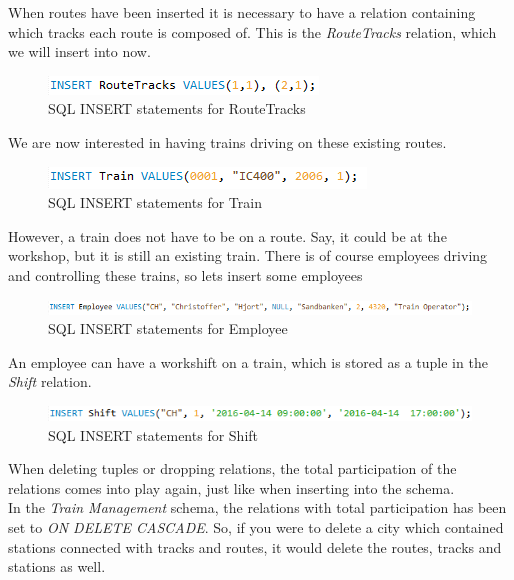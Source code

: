 When routes have been inserted it is necessary to have a relation containing which tracks each route is composed of. This is the \emph{RouteTracks} relation, which we will insert into now.

\begin{figure}[ht!]
    \centering
    \includegraphics[width=.5\textwidth]{img/INSERT_Statements_RouteTracks}
    \caption{SQL INSERT statements for RouteTracks}
\end{figure}

We are now interested in having trains driving on these existing routes.

\begin{figure}[ht!]
    \centering
    \includegraphics[width=.5\textwidth]{img/INSERT_Statements_Train}
    \caption{SQL INSERT statements for Train}
\end{figure}

However, a train does not have to be on a route. Say, it could be at the workshop, but it is still an existing train.
\newpage
There is of course employees driving and controlling these trains, so lets insert some employees

\begin{figure}[ht!]
    \centering
    \includegraphics[width=1\textwidth]{img/INSERT_Statements_Employee}
    \caption{SQL INSERT statements for Employee}
\end{figure}

An employee can have a workshift on a train, which is stored as a tuple in the \emph{Shift} relation.

\begin{figure}[ht!]
    \centering
    \includegraphics[width=.9\textwidth]{img/INSERT_Statements_Shift}
    \caption{SQL INSERT statements for Shift}
\end{figure}

When deleting tuples or dropping relations, the total participation of the relations comes into play again, just like when inserting into the schema.\\
In the \emph{Train Management} schema, the relations with total participation has been set to \emph{ON DELETE CASCADE}. So, if you were to delete a city which contained stations connected with tracks and routes, it would delete the routes, tracks and stations as well.\\

